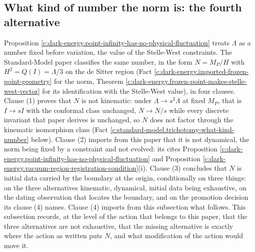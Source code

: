 \documentclass[11pt]{article}
\theoremstyle{definition}
\theoremstyle{plain}
\begin{document}
\subsection*{What kind of number the norm is: the fourth alternative}
\label{c:note.dark-energy.setting-what-kind-number-norm-fourth}
Proposition \ref{c:dark-energy.point-infinity-has-no-physical-fluctuation} treats $\Lambda$ as a number fixed before variation, the value of the Stelle-West constraints. The Standard-Model paper \cite[Prop.~7.6]{ButlerT12} classifies the same number, in the form $N = M_P/H$ with $H^2 = Q(I) = \Lambda/3$ on the de Sitter region (Fact \ref{c:dark-energy.imported-frozen-point-geometry} for the norm, Theorem \ref{c:dark-energy.frozen-point-makes-stelle-west-vector} for its identification with the Stelle-West value), in four clauses. Clause (1) proves that $N$ is not kinematic: under $\Lambda \to s^2\Lambda$ at fixed $M_P$, that is $I \to sI$ with the conformal class unchanged, $N \to N/s$ while every discrete invariant that paper derives is unchanged, so $N$ does not factor through the kinematic isomorphism class (Fact \ref{c:standard-model.trichotomy-what-kind-number} below). Clause (2) imports from this paper that it is not dynamical, the norm being fixed by a constraint and not evolved: its \cite[Fact~2.10]{ButlerT12} cites Proposition \ref{c:dark-energy.point-infinity-has-no-physical-fluctuation} and Proposition \ref{c:dark-energy.vacuum-region-registration-condition}(i). Clause (3) concludes that $N$ is initial data carried by the boundary at the origin, conditionally on three things: on the three alternatives kinematic, dynamical, initial data being exhaustive, on the dating observation \cite[Obs.~7.4]{ButlerT12} that locates the boundary, and on the promotion decision its clause (4) names. Clause (4) imports from this subsection what follows. This subsection records, at the level of the action that belongs to this paper, that the three alternatives are not exhaustive, that the missing alternative is exactly where the action as written puts $N$, and what modification of the action would move it.
\end{document}
